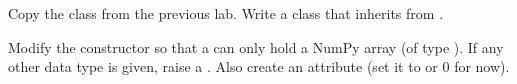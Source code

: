 \begin{problem} %
Copy the  class from the previous lab.%
Write a  class that inherits from .

Modify the constructor so that a  can only hold a NumPy array (of type ).
If any other data type is given, raise a .
Also create an  attribute (set it to  or $0$ for now).

\end{problem}

